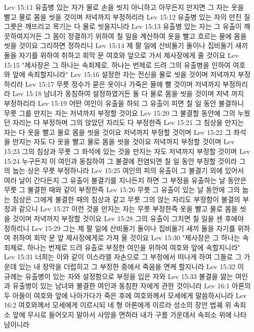 Lev 15:11  유출병 있는 자가 물로 손을 씻지 아니하고 아무든지 만지면 그 자는 옷을 빨고 물로 몸을 씻을 것이며 저녁까지 부정하리라
Lev 15:12  유출병 있는 자의 만진 질그릇은 깨뜨리고 목기는 다 물로 씻을지니라
Lev 15:13  유출병 있는 자는 그 유출이 깨끗하여지거든 그 몸이 정결하기 위하여 칠 일을 계산하여 옷을 빨고 흐르는 물에 몸을 씻을 것이요 그리하면 정하리니
Lev 15:14  제 팔 일에 산비둘기 둘이나 집비둘기 새끼 둘을 자기를 위하여 취하고 회막 문 여호와 앞으로 가서 제사장에게 줄 것이요
Lev 15:15  "제사장은 그 하나는 속죄제로, 하나는 번제로 드려 그의 유출병을 인하여 여호와 앞에 속죄할지니라"
Lev 15:16  설정한 자는 전신을 물로 씻을 것이며 저녁까지 부정하리라
Lev 15:17  무릇 정수가 묻은 옷이나 가죽은 물에 빨 것이며 저녁까지 부정하리라
Lev 15:18  남녀가 동침하여 설정하였거든 둘 다 물로 몸을 씻을 것이며 저녁 까지 부정하리라
Lev 15:19  어떤 여인이 유출을 하되 그 유출이 피면 칠 일 동안 불결하니 무릇 그를 만지는 자는 저녁까지 부정할 것이요
Lev 15:20  그 불결할 동안에 그의 누웠던 자리는 다 부정하며 그의 앉았던 자리도 다 부정한즉
Lev 15:21  그 침상을 만지는 자는 다 옷을 빨고 물로 몸을 씻을 것이요 저녁까지 부정할 것이며
Lev 15:22  그 좌석을 만지는 자도 다 옷을 빨고 물로 몸을 씻을 것이요 저녁까지 부정할 것이며
Lev 15:23  그의 침상과 무릇 그 좌석에 있는 것을 만지는 자도 저녁까지 부정할 것이며
Lev 15:24  누구든지 이 여인과 동침하여 그 불결에 전염되면 칠 일 동안 부정할 것이라 그의 눕는 상은 무릇 부정하니라
Lev 15:25  여인의 피의 유출이 그 불결기 외에 있어서 여러 날이 간다든지 그 유출이 불결기를 지나든지 하면 그 부정을 유출하는 날 동안은 무릇 그 불결한 때와 같이 부정한즉
Lev 15:26  무릇 그 유출이 있는 날 동안에 그의 눕는 침상은 그에게 불결한 때의 침상과 같고 무릇 그의 앉는 자리도 부정함이 불결의 부정과 같으니
Lev 15:27  이런 것을 만지는 자는 무릇 부정한즉 옷을 빨고 물로 몸을 씻을 것이며 저녁까지 부정할 것이요
Lev 15:28  그의 유출이 그치면 칠 일을 센 후에야 정하리니
Lev 15:29  그는 제 팔 일에 산비둘기 둘이나 집비둘기 새끼 둘을 자기를 위하여 취하여 회막 문 앞 제사장에게로 가져 올 것이요
Lev 15:30  "제사장은 그 하나는 속죄제로, 하나는 번제로 드려 유출로 부정한 여인을 위하여 여호와 앞에 속할지니라"
Lev 15:31  너희는 이와 같이 이스라엘 자손으로 그 부정에서 떠나게 하여 그들로 그 가운데 있는 내 장막을 더럽히고 그 부정한 중에서 죽음을 면케 할지니라
Lev 15:32  이 규례는 유출병이 있는 자와 설정함으로 부정을 입은 자와
Lev 15:33  불결을 앓는 여인과 유출병이 있는 남녀와 불결한 여인과 동침한 자에게 관한 것이니라
Lev 16:1  아론의 두 아들이 여호와 앞에 나아가다가 죽은 후에 여호와께서 모세에게 말씀하시니라
Lev 16:2  여호와께서 모세에게 이르시되 네 형 아론에게 이르라 성소의 장안 법궤 위 속죄소 앞에 무시로 들어오지 말아서 사망을 면하라 내가 구름 가운데서 속죄소 위에 나타남이니라
